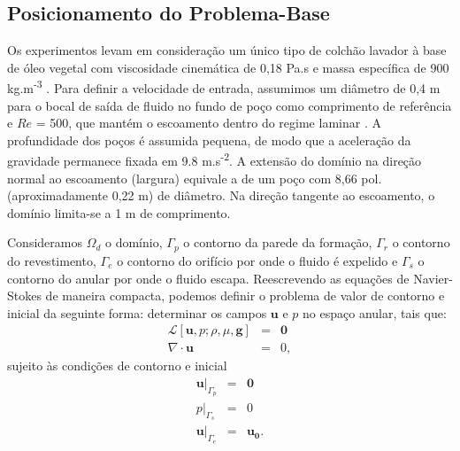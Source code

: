 \subsection{Posicionamento do Problema-Base}

Os experimentos levam em consideração um único tipo de colchão lavador à base de óleo vegetal com viscosidade cinemática de 0,18 Pa.s e massa específica de 900 kg.m\textsuperscript{-3} \cite{ARANHA}. Para definir a velocidade de entrada, assumimos um diâmetro de 0,4 m para o bocal de saída de fluido no fundo de poço como comprimento de referência e $Re$ = 500, que mantém o escoamento dentro do regime laminar \cite{Lupyana}. A profundidade dos poços é assumida pequena, de modo que a aceleração da gravidade permanece fixada em 9.8 m.s\textsuperscript{-2}. A extensão do domínio na direção normal ao escoamento (largura) equivale a de um poço com 8,66 pol. (aproximadamente 0,22 m) de diâmetro. Na direção tangente ao escoamento, o domínio limita-se a 1 m de comprimento.

Consideramos $\Omega_d$ o domínio, $\Gamma_p$ o contorno da parede da formação, $\Gamma_r$ o contorno do revestimento, $\Gamma_e$ o contorno do orifício por onde o fluido é expelido e $\Gamma_s$ o contorno do anular por onde o fluido escapa. Reescrevendo as equações de Navier-Stokes de maneira compacta, podemos definir o problema de valor de contorno e inicial da seguinte forma: determinar os campos $\boldsymbol{u}$ e $p$ no espaço anular, tais que:
\begin{eqnarray}
    \label{eq:problema-abstrato}
    		\mathcal{L}[\boldsymbol{u},p;\rho,\mu,\boldsymbol{g}] &=& \boldsymbol{0} \\
    		\nabla \cdot \boldsymbol{u} &=& 0,
\end{eqnarray}
sujeito às condições de contorno e inicial
      \begin{eqnarray}
    \label{eq:problema-abstrato}
    		\boldsymbol{u}|_{\Gamma_{p}} &=& \boldsymbol{0} \\
            p|_{\Gamma_{s}} &=& 0 \\
    		\boldsymbol{u}|_{\Gamma_{e}} &=& \boldsymbol{u_0}.
    \end{eqnarray}